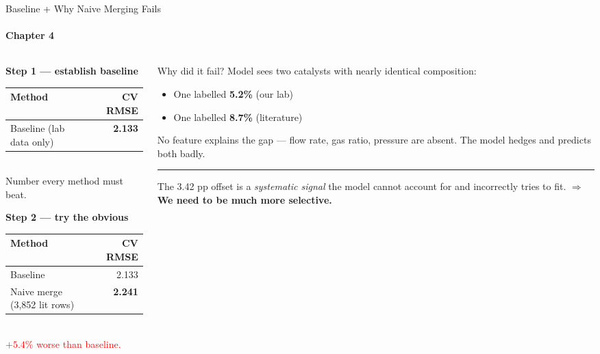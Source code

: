 \documentclass[aspectratio=169,12pt]{beamer}
\newcommand{\sidenote}[1]{%
  \vspace{4pt}%
  \noindent\textcolor{accent}{\rule{2pt}{0.9em}}\hspace{7pt}%
  \parbox[t]{0.90\linewidth}{\scriptsize\color{darkgray}#1}%
  \vspace{2pt}}
\begin{document}
\begin{frame}{Baseline + Why Naive Merging Fails}
  \framesubtitle{Chapter 4}

  \begin{columns}[T]

    \begin{column}{0.48\textwidth}
      \textbf{Step 1 — establish baseline}
      \begin{tabular}{lr}
        \toprule
        Method & CV RMSE \\
        \midrule
        Baseline (lab data only) & \textbf{2.133} \\
        \bottomrule
      \end{tabular}
      \vspace{4pt}\\
      \footnotesize Number every method must beat.

      \vspace{12pt}
      \textbf{Step 2 — try the obvious}
      \begin{tabular}{lr}
        \toprule
        Method & CV RMSE \\
        \midrule
        Baseline & 2.133 \\
        \rowcolor{red!15}
        Naive merge (3{,}852 lit rows) & \textbf{2.241} \\
        \bottomrule
      \end{tabular}
      \vspace{3pt}\\
      \textcolor{red}{$+5.4\%$ worse than baseline.}
    \end{column}

    \begin{column}{0.48\textwidth}
      \begin{block}{Why did it fail?}
        \small
        Model sees two catalysts with nearly identical composition:
        \begin{itemize}\small
          \item One labelled \textbf{5.2\%} (our lab)
          \item One labelled \textbf{8.7\%} (literature)
        \end{itemize}
        No feature explains the gap — flow rate, gas ratio, pressure
        are absent. The model hedges and predicts both badly.
      \end{block}

      \vspace{4pt}
      \sidenote{The 3.42 pp offset is a \emph{systematic signal} the model
        cannot account for and incorrectly tries to fit.
        $\Rightarrow$ \textbf{We need to be much more selective.}}
    \end{column}

  \end{columns}

\end{frame}
\end{document}
